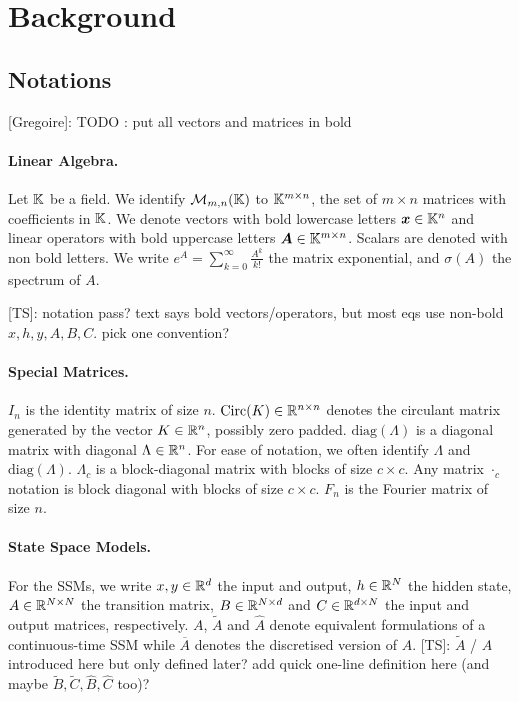 \documentclass{article}
\newcommand{\greg}[1]{{\color{indigo}[Gregoire]: #1}}
\newcommand{\TS}[1]{{\color{pink}[TS]: #1}}
\begin{document}
\section{Background}

\subsection{Notations}

\greg{TODO : put all vectors and matrices in bold}

\paragraph{Linear Algebra.} Let $\mathbb{K}$ be a field. We identify $\mathcal{M}_{m,n}(\mathbb{K})$ to $\mathbb{K}^{m \times n}$, the set of $m \!\times\! n$ matrices with coefficients in $\mathbb{K}$. We denote vectors with bold lowercase letters $\bm x \in \mathbb{K}^n$ and linear operators with bold uppercase letters $\bm A \in \mathbb{K}^{m \times n}$. Scalars are denoted with non bold letters. We write $e^A = \sum_{k=0}^\infty \frac{A^k}{k!}$ the matrix exponential, and $\sigma(A)$ the spectrum of $A$.

\TS{notation pass? text says bold vectors/operators, but most eqs use non-bold $x,h,y,A,B,C$. pick one convention?}

\paragraph{Special Matrices.} $I_n$ is the identity matrix of size $n$. $\mathrm{Circ}(K) \in \mathbb{R}^{n \times n}$ denotes the circulant matrix generated by the vector $K \in \mathbb{R}^n$, possibly zero padded. $\mathrm{diag}(\Lambda)$ is a diagonal matrix with diagonal $\Lambda \in \mathbb{R}^n$. For ease of notation, we often identify $\Lambda$ and $\mathrm{diag}(\Lambda)$. $\Lambda_c$ is a block-diagonal matrix with blocks of size $c \!\times\! c$. Any matrix $\cdot_c$ notation is block diagonal with blocks of size $c \!\times\! c$. $F_n$ is the Fourier matrix of size $n$.

\paragraph{State Space Models.} For the SSMs, we write $x, y \in \mathbb{R}^{d}$ the input and output, $h \in \mathbb{R}^{N}$ the hidden state, $A \in \mathbb{R}^{{N}\times {N}}$ the transition matrix, $B \in \mathbb{R}^{N \times d}$ and $C \in \mathbb{R}^{d \times N}$ the input and output matrices, respectively. $A$, $\widetilde{A}$ and $\widehat{A}$ denote equivalent formulations of a continuous-time SSM while $\overline{A}$ denotes the discretised version of $A$.
\TS{$\widetilde{A}$ / $\widehat{A}$ introduced here but only defined later? add quick one-line definition here (and maybe $\widetilde{B},\widetilde{C},\widehat{B},\widehat{C}$ too)?}
\end{document}

